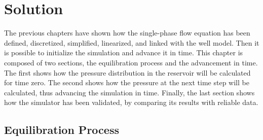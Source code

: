 \chapter{Solution}
\label{solution}

The previous chapters have shown how the single-phase flow equation has been defined, discretized, simplified, linearized, and linked with the well model. Then it is possible to initialize the simulation and advance it in time. This chapter is composed of two sections, the equilibration process and the advancement in time. The first shows how the pressure distribution in the reservoir will be calculated for time zero. The second shows how the pressure at the next time step will be calculated, thus advancing the simulation in time. Finally, the last section shows how the simulator has been validated, by comparing its results with reliable data.

\section{Equilibration Process}

